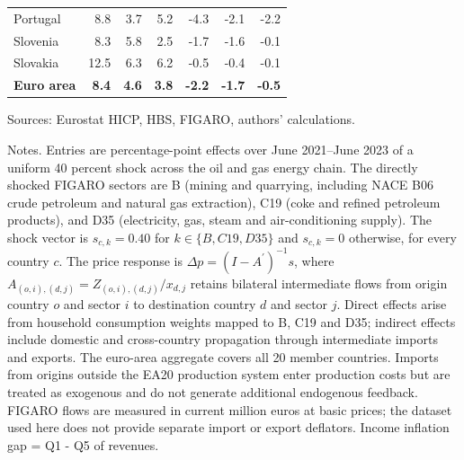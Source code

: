 \documentclass[11pt]{article}
\begin{document}
\begin{table}[H]
\begin{tabular}{lrrrrrr}
 \\
Portugal & 8.8 & 3.7 & 5.2 & -4.3 & -2.1 & -2.2
 \\
Slovenia & 8.3 & 5.8 & 2.5 & -1.7 & -1.6 & -0.1
 \\
Slovakia & 12.5 & 6.3 & 6.2 & -0.5 & -0.4 & -0.1
 \\
\midrule
\textbf{Euro area} & \textbf{8.4} & \textbf{4.6} & \textbf{3.8} & \textbf{-2.2} & \textbf{-1.7} & \textbf{-0.5}
 \\
\bottomrule
\end{tabular}
\par\vspace{0.35em}\footnotesize\noindent Sources: Eurostat HICP, HBS, FIGARO, authors' calculations.
\par\vspace{0.25em}\footnotesize\noindent Notes. Entries are percentage-point effects over June 2021--June 2023 of a uniform 40 percent shock across the oil and gas energy chain. The directly shocked FIGARO sectors are B (mining and quarrying, including NACE B06 crude petroleum and natural gas extraction), C19 (coke and refined petroleum products), and D35 (electricity, gas, steam and air-conditioning supply). The shock vector is $s_{c,k}=0.40$ for $k\in\{B,C19,D35\}$ and $s_{c,k}=0$ otherwise, for every country $c$. The price response is $\Delta p = (I - A^{\prime})^{-1}s$, where $A_{(o,i),(d,j)}=Z_{(o,i),(d,j)}/x_{d,j}$ retains bilateral intermediate flows from origin country $o$ and sector $i$ to destination country $d$ and sector $j$. Direct effects arise from household consumption weights mapped to B, C19 and D35; indirect effects include domestic and cross-country propagation through intermediate imports and exports. The euro-area aggregate covers all 20 member countries. Imports from origins outside the EA20 production system enter production costs but are treated as exogenous and do not generate additional endogenous feedback. FIGARO flows are measured in current million euros at basic prices; the dataset used here does not provide separate import or export deflators. Income inflation gap = Q1 - Q5 of revenues.
\end{table}
\vspace{0.6em}
\end{document}
